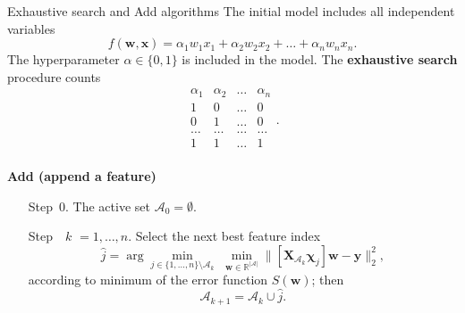 \documentclass{beamer}
\begin{document}
\begin{frame}[t]{Exhaustive search and Add algorithms}
\vspace{-.5cm}
The initial model includes all independent variables
$$
f(\mathbf{w},\mathbf{x}) = \alpha_1 w_1 x_1 + \alpha_2 w_2 x_2 + \ldots +\alpha_n w_n x_n.
$$
The hyperparameter $\alpha\in\{0,1\}$ is included in the model. The {\bf exhaustive search} procedure counts
$$
\begin{array}{cccc}
\alpha_1 & \alpha_2 & \ldots & \alpha_n \\
\hline
1 & 0 & \ldots & 0 \\
0 & 1 & \ldots & 0 \\
\ldots & \ldots & \ldots & \ldots \\
1 & 1 & \ldots & 1 \\
\end{array}.
$$

{\bf Add (append a feature)}

\begin{enumerate}
\item[Step~0.]
The active set $\mathcal{A}_0=\emptyset$.
\item[Step~~$k$]$=1,\ldots,n$.
Select the next best feature index
$$
\hat{j}=\arg\min_{j\in \{1,\dots,n\}\setminus\mathcal{A}_k}\text{~}\min\limits_{\mathbf{w}\in\mathbb{R}^{|\mathcal{A}|}}\|[\mathbf{X}_{\mathcal{A}_{k}}\boldsymbol{\chi}_j]\mathbf{w}-\mathbf{y}\|_2^2,
$$
according to minimum of the error function $S(\mathbf{w})$; then
$$
\mathcal{A}_{k+1}=\mathcal{A}_k\cup\hat{j}.
$$
\end{enumerate}
\end{frame}
\end{document}

